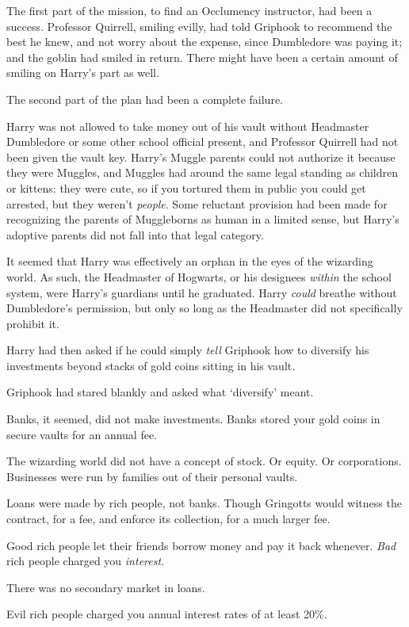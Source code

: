 The first part of the mission, to find an Occlumency instructor, had been a 
success. Professor Quirrell, smiling evilly, had told Griphook to recommend the 
best he knew, and not worry about the expense, since Dumbledore was paying it; 
and the goblin had smiled in return. There might have been a certain amount of 
smiling on Harry's part as well.

The second part of the plan had been a complete failure.

Harry was not allowed to take money out of his vault without Headmaster 
Dumbledore or some other school official present, and Professor Quirrell had 
not been given the vault key. Harry's Muggle parents could not authorize it 
because they were Muggles, and Muggles had around the same legal standing as 
children or kittens: they were cute, so if you tortured them in public you 
could get arrested, but they weren't \emph{people}. Some reluctant provision 
had been made for recognizing the parents of Muggleborns as human in a limited 
sense, but Harry's adoptive parents did not fall into that legal category.

It seemed that Harry was effectively an orphan in the eyes of the wizarding 
world. As such, the Headmaster of Hogwarts, or his designees \emph{within} the 
school system, were Harry's guardians until he graduated. Harry \emph{could} 
breathe without Dumbledore's permission, but only so long as the Headmaster did 
not specifically prohibit it.

Harry had then asked if he could simply \emph{tell} Griphook how to diversify 
his investments beyond stacks of gold coins sitting in his vault.

Griphook had stared blankly and asked what `diversify' meant.

Banks, it seemed, did not make investments. Banks stored your gold coins in 
secure vaults for an annual fee.

The wizarding world did not have a concept of stock. Or equity. Or 
corporations. Businesses were run by families out of their personal vaults.

Loans were made by rich people, not banks. Though Gringotts would witness the 
contract, for a fee, and enforce its collection, for a much larger fee.

Good rich people let their friends borrow money and pay it back whenever. 
\emph{Bad} rich people charged you \emph{interest.}

There was no secondary market in loans.

Evil rich people charged you annual interest rates of at least 20\%.

